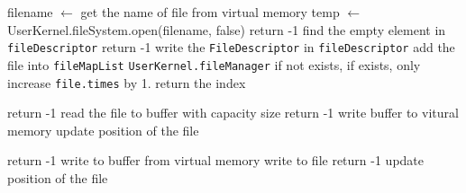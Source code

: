 \documentclass{article}
\begin{document}
\begin{algorithm}
    \begin{algorithmic}
            \State filename $\leftarrow$ get the name of file from virtual memory
            \State temp $\leftarrow$ UserKernel.fileSystem.open(filename, false)
                \State return -1
            \Else
                \State find the empty element in \texttt{fileDescriptor}
                    \State return -1
                \Else
								\State write the \texttt{FileDescriptor} in \texttt{fileDescriptor}
										\State add the file into \texttt{fileMapList} \texttt{UserKernel.fileManager} if not exists,
										\State if exists, only increase \texttt{file.times} by 1.
                    \State return the index
                \EndIf
            \EndIf
        \EndProcedure
    \end{algorithmic}
    \begin{algorithmic}
                \State return -1
            \EndIf
            \State read the file to buffer with capacity size
                \State return -1
            \Else
                \State write buffer to vitural memory
                \State update position of the file
            \EndIf
        \EndProcedure
    \end{algorithmic}
    \begin{algorithmic}
                \State return -1
            \EndIf
            \State write to buffer from virtual memory
            \State write to file
                \State return -1
            \Else
                \State update position of the file
            \EndIf
        \EndProcedure
    \end{algorithmic}
\end{algorithm}
\end{document}
